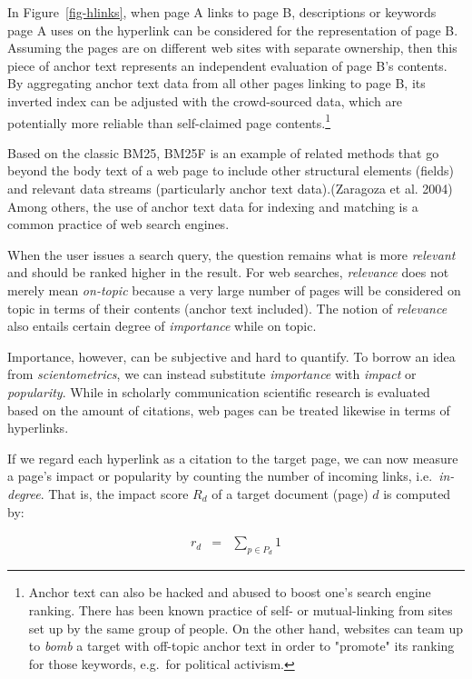 \documentclass[
  letterpaper,
]{scrbook}
\begin{document}
In Figure~\ref{fig-hlinks}, when page A links to page B, descriptions or
keywords page A uses on the hyperlink can be considered for the
representation of page B. Assuming the pages are on different web sites
with separate ownership, then this piece of anchor text represents an
independent evaluation of page B's contents. By aggregating anchor text
data from all other pages linking to page B, its inverted index can be
adjusted with the crowd-sourced data, which are potentially more
reliable than self-claimed page contents.\footnote{Anchor text can also
  be hacked and abused to boost one's search engine ranking. There has
  been known practice of self- or mutual-linking from sites set up by
  the same group of people. On the other hand, websites can team up to
  \emph{bomb} a target with off-topic anchor text in order to "promote"
  its ranking for those keywords, e.g.~for political activism.}

Based on the classic BM25, BM25F is an example of related methods that
go beyond the body text of a web page to include other structural
elements (fields) and relevant data streams (particularly anchor text
data).(Zaragoza et al. 2004) Among others, the use of anchor text data
for indexing and matching is a common practice of web search engines.

When the user issues a search query, the question remains what is more
\emph{relevant} and should be ranked higher in the result. For web
searches, \emph{relevance} does not merely mean \emph{on-topic} because
a very large number of pages will be considered on topic in terms of
their contents (anchor text included). The notion of \emph{relevance}
also entails certain degree of \emph{importance} while on topic.

Importance, however, can be subjective and hard to quantify. To borrow
an idea from \emph{scientometrics}, we can instead substitute
\emph{importance} with \emph{impact} or \emph{popularity}. While in
scholarly communication scientific research is evaluated based on the
amount of citations, web pages can be treated likewise in terms of
hyperlinks.

If we regard each hyperlink as a citation to the target page, we can now
measure a page's impact or popularity by counting the number of incoming
links, i.e.~\emph{in-degree}. That is, the impact score \(R_d\) of a
target document (page) \(d\) is computed by:

\[\begin{aligned}
r_d & = & \sum_{p \in P_d} 1
\end{aligned}\]
\end{document}
